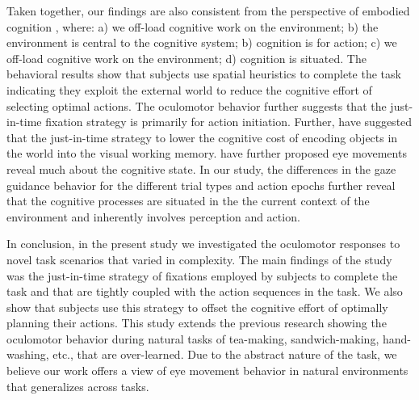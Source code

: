 Taken together, our findings are also consistent from the perspective of embodied cognition \citep{Wilson2002-mv, Ballard2013-lo, Van_der_Stigchel2020-qb}, where: a) we off-load cognitive work on the environment; b) the environment is central to the cognitive system; b) cognition is for action; c) we off-load cognitive work on the environment; d) cognition is situated. The behavioral results show that subjects use spatial heuristics to complete the task indicating they exploit the external world to reduce the cognitive effort of selecting optimal actions. The oculomotor behavior further suggests that the just-in-time fixation strategy is primarily for action initiation. Further, \citet{Droll2007-bp} have suggested that the just-in-time strategy to lower the cognitive cost of encoding objects in the world into the visual working memory. \citet{Konig2016-ew} have further proposed eye movements reveal much about the cognitive state. In our study, the differences in the gaze guidance behavior for the different trial types and action epochs further reveal that the cognitive processes are situated in the the current context of the environment and inherently involves perception and action.

In conclusion, in the present study we investigated the oculomotor responses to novel task scenarios that varied in complexity. The main findings of the study was the just-in-time strategy of fixations employed by subjects to complete the task and that are tightly coupled with the action sequences in the task. We also show that subjects use this strategy to offset the cognitive effort of optimally planning their actions. This study extends the previous research showing the oculomotor behavior during natural tasks of tea-making, sandwich-making, hand-washing, etc., that are over-learned. Due to the abstract nature of the task, we believe our work offers a view of eye movement behavior in natural environments that generalizes across tasks.



